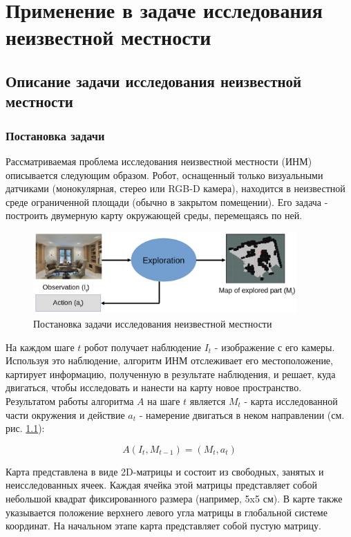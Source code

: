\documentclass{mipt-thesis-ms}
\begin{document}
	\chapter{Применение в задаче исследования неизвестной местности}
	
	\section{Описание задачи исследования неизвестной местности}
	
	\subsection{Постановка задачи}
	
	Рассматриваемая проблема исследования неизвестной местности (ИНМ) описывается следующим образом. Робот, оснащенный только визуальными датчиками (монокулярная, стерео или RGB-D камера), находится в неизвестной среде ограниченной площади (обычно в закрытом помещении). Его задача - построить двумерную карту окружающей среды, перемещаясь по ней.
	
	\begin{figure}
		\centering
		\includegraphics[width=0.9\textwidth]{img/exploration_problem_setting.png}
		\caption{Постановка задачи исследования неизвестной местности}
		\label{figure_exploration_setting}
	\end{figure}
	
	На каждом шаге $ t $ робот получает наблюдение $ I_t $ - изображение с его камеры. Используя это наблюдение, алгоритм ИНМ отслеживает его местоположение, картирует информацию, полученную в результате наблюдения, и решает, куда двигаться, чтобы исследовать и нанести на карту новое пространство. Результатом работы алгоритма $ A $ на шаге $ t $ является $ M_t $ - карта исследованной части окружения и действие $ a_t $ - намерение двигаться в неком направлении (см. рис. \ref{figure_exploration_setting}):
	
	$$ A (I_t, M_ {t-1}) = (M_t, a_t) $$
	
	Карта представлена в виде 2D-матрицы и состоит из свободных, занятых и неисследованных ячеек. Каждая ячейка этой матрицы представляет собой небольшой квадрат фиксированного размера (например, 5x5 см). В карте также указывается положение верхнего левого угла матрицы в глобальной системе координат. На начальном этапе карта представляет собой пустую матрицу.
	
\end{document}
